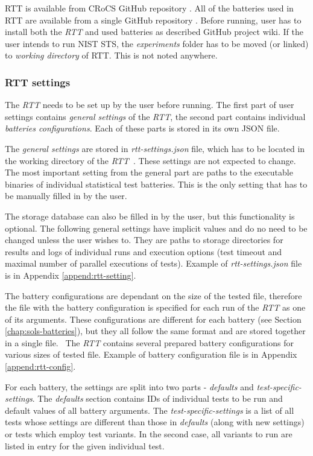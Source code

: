 \documentclass[
  digital,     %
  oneside,     %
  nosansbold,  %
  nocolorbold, %
  nolof,         %
  nolot,         %
]{fithesis4}
\begin{document}
RTT is available from CRoCS GitHub repository \cite{rtt-site}. All of the batteries used in RTT are available from a single GitHub repository \cite{rtt-batteries}. Before running, user has to install both the \emph{RTT} and used batteries as described GitHub project wiki. If the user intends to run NIST STS, the \emph{experiments} folder has to be moved (or linked) to \emph{working directory} of RTT. This is not noted anywhere.

\subsubsection{RTT settings}\label{rtt-settings} 
The \emph{RTT} needs to be set up by the user before running. The first part of user settings contains \emph{general settings} of the \emph{RTT}, the second part contains individual \emph{batteries configurations}. Each of these parts is stored in its own JSON file. 

The \emph{general settings} are stored in \emph{rtt-settings.json} file, which has to be located in the working directory of the \emph{RTT}~\cite[p.~10]{rtt-obratil}. These settings are not expected to change. The most important setting from the general part are paths to the executable binaries of individual statistical test batteries. This is the only setting that has to be manually filled in by the user.

The storage database can also be filled in by the user, but this functionality is optional. The following general settings have implicit values and do no need to be changed unless the user wishes to. They are paths to storage directories for results and logs of individual runs and execution options (test timeout and maximal number of parallel executions of tests). Example of \emph{rtt-settings.json} file is in Appendix \ref{append:rtt-setting}.

The battery configurations are dependant on the size of the tested file, therefore the file with the battery configuration is specified for each run of the \emph{RTT} as one of its arguments. These configurations are different for each battery (see Section \ref{chap:sols-batteries}), but they all follow the same format and are stored together in a single file.~\cite[p.~11]{rtt-obratil} The \emph{RTT} contains several prepared battery configurations for various sizes of tested file. Example of battery configuration file is in Appendix \ref{append:rtt-config}.

For each battery, the settings are split into two parts - \emph{defaults} and \emph{test-specific-settings}. The \emph{defaults} section contains IDs of individual tests to be run and default values of all battery arguments. The \emph{test-specific-settings} is a list of all tests whose settings are different than those in \emph{defaults} (along with new settings) or tests which employ test variants. In the second case, all variants to run are listed in entry for the given individual test.
\end{document}
